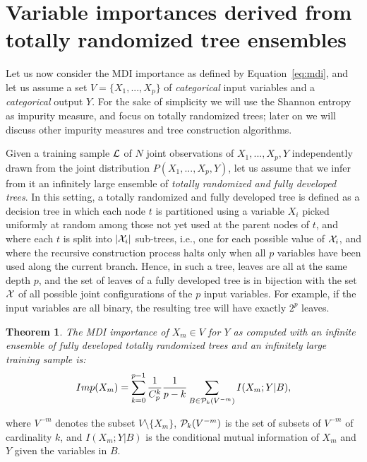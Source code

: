 \documentclass{article}
\newtheorem{theorem}{Theorem}
\begin{document}

\section{Variable importances derived from totally randomized tree ensembles}
\label{sec:var-imp}

Let us now consider the MDI  importance
as defined by Equation~\ref{eq:mdi}, and let us assume a set $V= \{X_1, ..., X_p\}$  of {\em categorical}
input variables and a {\em categorical} output $Y$. For the sake of
simplicity we will  use the Shannon entropy as impurity measure, and focus on
totally randomized trees; later on we will discuss other impurity measures and tree construction algorithms.

Given a training sample ${\cal L}$ of $N$ joint observations of $X_1, ..., X_p,
Y$ independently drawn from the joint distribution $P(X_1, ..., X_p, Y)$, let us
assume that we infer from it an infinitely large ensemble of \textit{totally
randomized and fully developed trees}. In this setting, a totally randomized and
fully developed tree is defined as a decision tree in which each node $t$ is
partitioned using a variable $X_i$ picked uniformly at random among those not
yet used at the parent nodes of $t$, and where each $t$ is split into $|{\cal
X}_i|$ sub-trees, i.e., one for each possible value of ${\cal X}_i$, and where
the recursive construction process halts only when all $p$ variables have been
used along the current branch.  Hence, in such a tree, leaves are all at the
same depth $p$, and the set of leaves of a fully developed tree is in bijection
with the set $\cal X$ of all possible joint configurations of the $p$ input
variables. For example, if the input variables are all binary, the resulting
tree will have exactly $2^{p}$ leaves.

\begin{theorem}\label{thm:imp}
The MDI importance of $X_m \in V$ for $Y$ as computed
with an   infinite ensemble of fully developed totally randomized trees and an
infinitely large training sample is:
  \begin{equation}\label{eqn:imp-full}
  Imp(X_m)=\sum_{k=0}^{p-1} \frac{1}{C_p^k} \frac{1}{p-k} \sum_{B \in {\cal P}_k(V^{-m})} I(X_m;Y|B),
  \end{equation}
\end{theorem}
\noindent where $V^{-m}$ denotes the subset $V \setminus \{X_m\}$, ${\cal
P}_k(V^{-m})$ is the set of subsets of  $V^{-m}$ of cardinality $k$, and
$I(X_m;Y|B)$ is the conditional mutual information of $X_{m}$ and $Y$ given the
variables in $B$.
\end{document}
